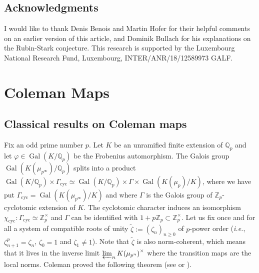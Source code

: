 \documentclass[12pt]{amsart}
\newcommand\bZ{\mathbb{Z}}
\newcommand\Zp{{\mathbb{Z}_p}}
\newcommand\Qp{{\mathbb{Q}_p}}
\DeclareMathOperator{\Gal}{Gal}
\DeclareMathOperator{\cyc}{cyc}
\theoremstyle{defstyle}
\theoremstyle{thmstyle}
\begin{document}
\subsection*{Acknowledgments}
I would like to thank Denis Benois and Martin Hofer for their helpful comments on an earlier version of this article, and Dominik Bullach for his explanations on the Rubin-Stark conjecture. 
This research is supported by the Luxembourg National Research Fund, Luxembourg, INTER/ANR/18/12589973 GALF.

\section{Coleman Maps}\label{sec:coleman}
\subsection{Classical results on Coleman maps}\label{sec:coleman_intro}
Fix an odd prime number $p$. Let $K$ be an unramified finite extension of $\Qp$ and let $\varphi \in \Gal(K/\Qp)$ be the Frobenius automorphism.
The Galois group $\Gal(K(\mu_{p^\infty})/\Qp)$ splits into a product $\Gal(K/\Qp) \times \Gamma_{{\cyc}} \simeq \Gal(K/\Qp) \times \Gamma \times \Gal(K(\mu_p)/K)$, where we have put $\Gamma_{{\cyc}}=\Gal(K(\mu_{p^\infty})/K)$ and where $\Gamma$ is the Galois group of $\Zp$-cyclotomic extension of $K$.
The cyclotomic character induces an isomorphism $\chi_{\cyc}:\Gamma_{{\cyc}} \simeq \bZ^\times_p$ and $\Gamma$ can be identified with $1+p\Zp\subset \bZ^\times_p$. Let us fix once and for all a system of compatible roots of unity $\tilde{\zeta}:=(\zeta_n)_{n\geq 0}$ of $p$-power order (\textit{i.e.}, $\zeta_{n+1}^p=\zeta_n$, $\zeta_0=1$ and $\zeta_1 \neq 1$). Note that $\tilde{\zeta}$ is also norm-coherent, which means that it lives in the inverse limit $\varprojlim_n {K(\mu_{p^n})}^\times$ where the transition maps are the local norms. Coleman proved the following theorem (see \cite[Thm. A]{coleman} or \cite[Chapter I, §2]{deshalit}).
\end{document}
